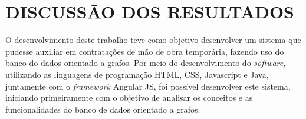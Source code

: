 
\chapter{DISCUSSÃO DOS RESULTADOS} 

\par O desenvolvimento deste trabalho teve como objetivo desenvolver um sistema que pudesse auxiliar em contratações de mão de obra temporária, fazendo uso do banco do dados orientado a grafos. Por meio do desenvolvimento do \textit{software}, utilizando as linguagens de programação HTML, CSS, Javascript e Java, juntamente com o \textit{framework} Angular JS, foi possível desenvolver este sistema, iniciando primeiramente com o objetivo de analisar os conceitos e as funcionalidades do banco de dados orientado a grafos.

\par 


